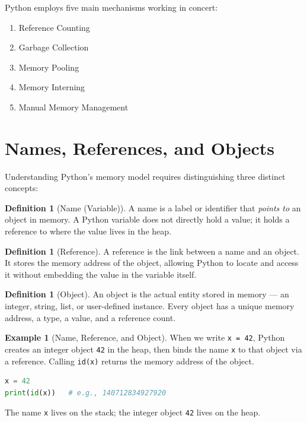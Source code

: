 \documentclass[11pt, a4paper, notitlepage]{report}
\theoremstyle{definition}
\newtheorem{definition}[theorem]{Definition}
\theoremstyle{remark}
\theoremstyle{definition}
\newtheorem{example}[theorem]{Example}
\begin{document}
\begin{keyresult}[title={Core Memory Management Mechanisms}]
Python employs five main mechanisms working in concert:
\begin{enumerate}
  \item Reference Counting
  \item Garbage Collection
  \item Memory Pooling
  \item Memory Interning
  \item Manual Memory Management
\end{enumerate}
\end{keyresult}

\section{Names, References, and Objects}
\label{sec:names-refs-objs}

Understanding Python's memory model requires distinguishing three distinct concepts:

\begin{definition}[Name (Variable)]
A name is a label or identifier that \emph{points to} an object in memory. A Python variable
does not directly hold a value; it holds a reference to where the value lives in the heap.
\end{definition}

\begin{definition}[Reference]
A reference is the link between a name and an object. It stores the memory address of the
object, allowing Python to locate and access it without embedding the value in the variable
itself.
\end{definition}

\begin{definition}[Object]
An object is the actual entity stored in memory --- an integer, string, list, or user-defined
instance. Every object has a unique memory address, a type, a value, and a reference count.
\end{definition}

\begin{example}[Name, Reference, and Object]
When we write \texttt{x = 42}, Python creates an integer object \texttt{42} in the heap, then
binds the name \texttt{x} to that object via a reference. Calling \texttt{id(x)} returns the
memory address of the object.
\begin{lstlisting}[language=Python]
x = 42
print(id(x))   # e.g., 140712834927920
\end{lstlisting}
The name \texttt{x} lives on the stack; the integer object \texttt{42} lives on the heap.
\end{example}
\end{document}

